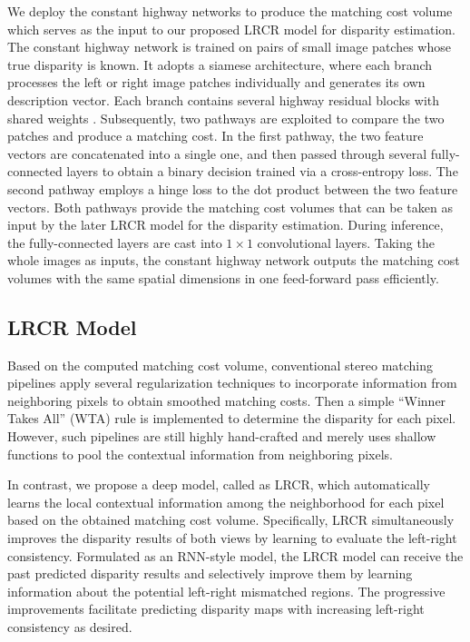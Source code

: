 \documentclass[10pt,twocolumn,letterpaper]{article}
\begin{document}
We deploy the constant highway networks \cite{shaked2016improved} to produce the matching cost volume which serves as the input to our proposed LRCR model for disparity estimation. The constant highway network is trained on pairs of small image patches whose true disparity is known. It adopts  a siamese architecture, where each branch processes the left or right image patches individually  and generates its own description vector. Each branch contains several  highway residual blocks with shared weights \cite{shaked2016improved}. Subsequently, two pathways are exploited to compare the two patches and produce a matching cost. In the first pathway, the two feature vectors are concatenated into a single one, and then passed through several fully-connected layers to obtain a binary decision trained via a cross-entropy loss. The second pathway employs a hinge loss to the dot product between the two feature vectors.  Both pathways provide the matching cost volumes that can be taken as input by the later LRCR model for the disparity estimation. During inference, the fully-connected layers are cast into $1 \times 1$ convolutional layers. Taking the whole images as inputs,   the constant highway network outputs the matching cost volumes with the same spatial dimensions in one feed-forward pass efficiently.

\subsection{LRCR Model}
Based on the computed matching cost volume, conventional stereo matching pipelines apply several regularization techniques to incorporate information from  neighboring pixels to obtain smoothed matching costs. Then a simple ``Winner Takes All'' (WTA) rule is implemented to determine the disparity for each pixel. However, such pipelines are still highly hand-crafted and merely uses shallow functions to pool the contextual information from neighboring pixels.

In contrast, we propose a deep model, called as LRCR,  which automatically learns the local contextual information  among the neighborhood for each pixel based on the obtained matching cost volume. Specifically, LRCR  simultaneously improves the disparity results of both views by learning to evaluate the left-right consistency. Formulated as an RNN-style model, the LRCR model can receive the past predicted disparity results and selectively improve them by learning  information about the potential left-right mismatched regions. The progressive improvements facilitate predicting disparity maps with  increasing left-right consistency as desired.
\end{document}
